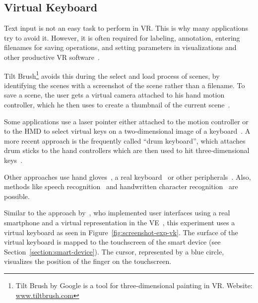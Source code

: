 \subsection{Virtual Keyboard}\label{subsection:virtual-keyboard}

Text input is not an easy task to perform in \gls{VR}. This is why many applications try to avoid it. However, it is often required for labeling, annotation, entering filenames for saving operations, and setting parameters in visualizations and other productive \gls{VR} software~\cite[2154]{Rhoton.2002}. 

Tilt Brush\footnote{Tilt Brush by Google is a tool for three-dimensional painting in VR. Website: \href{https://www.tiltbrush.com/}{www.tiltbrush.com}} avoids this during the select and load process of scenes, by identifying the scenes with a screenshot of the scene rather than a filename. To save a scene, the user gets a virtual camera attached to his hand motion controller, which he then uses to create a thumbnail of the current scene~\cite{GoogleLLC.2019}. %

Some applications use a laser pointer either attached to the motion controller or to the \gls{HMD} to select virtual keys on a two-dimensional image of a keyboard~\cite{WeelcoInc.2017}. A more recent approach is the frequently called \enquote{drum keyboard}, which attaches drum sticks to the hand controllers which are then used to hit three-dimensional keys~\cite{Weisel.2017}.

Other approaches use hand gloves~\cite{Evans.1999,Rhoton.2002}, a real keyboard~\cite{McGill.2015,Walker.2017} or other peripherals~\cite[111\psq]{Gonzalez.2009}. Also, methods like speech recognition~\cite[2154\psqq]{Rhoton.2002} and handwritten character recognition~\cite[113]{Gonzalez.2009} are possible.

Similar to the approach by~\citeauthor{Dias.2018}, who implemented user interfaces using a real smartphone and a virtual representation in the \gls{VE}~\cite[5]{Dias.2018}, this experiment uses a virtual keyboard as seen in Figure~\ref{fig:screenshot-exp-vk}.
The surface of the virtual keyboard is mapped to the touchscreen of the smart device (see Section~\ref{section:smart-device}). The cursor, represented by a blue circle, visualizes the position of the finger on the touchscreen.

